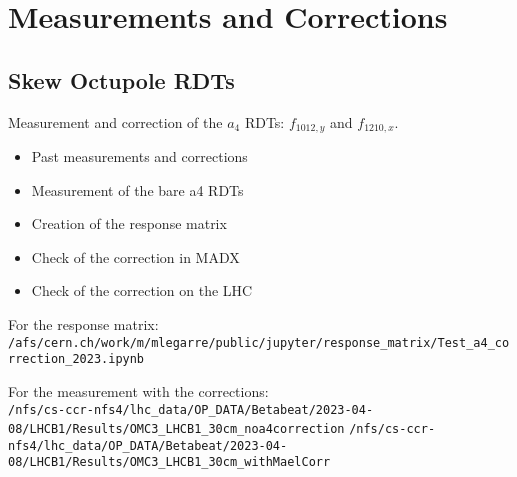 \documentclass[12pt,a4,]{article}
\numberwithin{equation}{subsection}
\begin{document}
\section{Measurements and Corrections}

\subsection{Skew Octupole RDTs}

Measurement and correction of the $a_4$ RDTs: $f_{1012,y}$ and $f_{1210,x}$.

\begin{itemize}
    \item Past measurements and corrections
    \item Measurement of the bare a4 RDTs
    \item Creation of the response matrix
    \item Check of the correction in MADX
    \item Check of the correction on the LHC
\end{itemize}

For the response matrix: \\
\footnotesize
\verb|/afs/cern.ch/work/m/mlegarre/public/jupyter/response_matrix/Test_a4_correction_2023.ipynb|
\normalsize

For the measurement with the corrections: \\
\footnotesize
\verb|/nfs/cs-ccr-nfs4/lhc_data/OP_DATA/Betabeat/2023-04-08/LHCB1/Results/OMC3_LHCB1_30cm_noa4correction|
\verb|/nfs/cs-ccr-nfs4/lhc_data/OP_DATA/Betabeat/2023-04-08/LHCB1/Results/OMC3_LHCB1_30cm_withMaelCorr|
\normalsize

\label{End}
\end{document}
